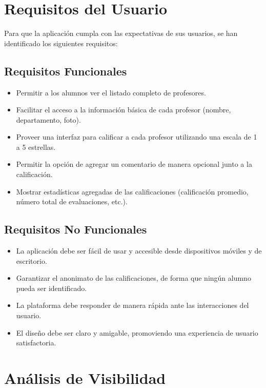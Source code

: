 \documentclass[11pt]{article}
\begin{document}
\newpage
\section{Requisitos del Usuario}

Para que la aplicación cumpla con las expectativas de sus usuarios, se han identificado los siguientes requisitos:

\subsection*{Requisitos Funcionales}
\begin{itemize}
    \item Permitir a los alumnos ver el listado completo de profesores.
    \item Facilitar el acceso a la información básica de cada profesor (nombre, departamento, foto).
    \item Proveer una interfaz para calificar a cada profesor utilizando una escala de 1 a 5 estrellas.
    \item Permitir la opción de agregar un comentario de manera opcional junto a la calificación.
    \item Mostrar estadísticas agregadas de las calificaciones (calificación promedio, número total de evaluaciones, etc.).
\end{itemize}

\subsection*{Requisitos No Funcionales}
\begin{itemize}
    \item La aplicación debe ser fácil de usar y accesible desde dispositivos móviles y de escritorio.
    \item Garantizar el anonimato de las calificaciones, de forma que ningún alumno pueda ser identificado.
    \item La plataforma debe responder de manera rápida ante las interacciones del usuario.
    \item El diseño debe ser claro y amigable, promoviendo una experiencia de usuario satisfactoria.
\end{itemize}

\newpage
\section{Análisis de Visibilidad}
\end{document}
